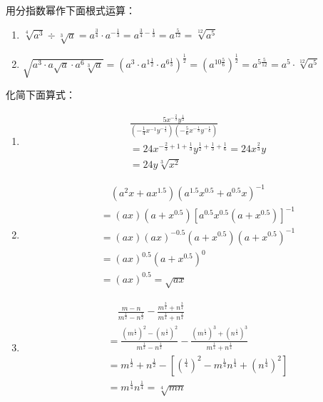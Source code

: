 \begin{example}
    用分指数幂作下面根式运算：
\begin{enumerate}
    \item $\sqrt[4]{a^3}\div \sqrt[3]{a}=a^{\tfrac{3}{4}}\cdot a^{-\tfrac{1}{3}}=a^{\tfrac{3}{4}-\tfrac{1}{3}}=a^{\tfrac{5}{12}}=\sqrt[12]{a^5}$
    \item $\sqrt{a^3\cdot a\sqrt{a}\cdot a^6 \sqrt[3]{a}}=\left(a^3\cdot a^{1\tfrac{1}{2}}\cdot a^{6\tfrac{1}{3}}\right)^{\tfrac{1}{2}}=\left(a^{10\tfrac{5}{6}}\right)^{\tfrac{1}{2}}=a^{5\tfrac{5}{12}}=a^{5}\cdot \sqrt[12]{a^5}$
\end{enumerate}
    
\end{example}

\begin{example}
    化简下面算式：
\begin{enumerate}
    \item \[\begin{split}
&\frac{5 x^{-\tfrac{2}{3}} y^{\tfrac{1}{2}}}{\left(-\frac{1}{4}x^{-1} y^{-\tfrac{1}{3}}\right)\left(-\frac{5}{6} x^{-\tfrac{1}{3}} y^{-\tfrac{1}{6}}\right)} \\
&=24 x^{-\tfrac{2}{3}+1+\tfrac{1}{3}} y^{\tfrac{1}{2}+\tfrac{1}{3}+\tfrac{1}{6}}=24 x^{\tfrac{2}{3}} y \\
&=24 y \sqrt[3]{x^{2}}
\end{split}\]
\item \[\begin{split}
& \quad   \left(a^{2} x+a x^{1.5} \right)\left(a^{1.5} x^{0.5}+a^{0.5} x\right)^{-1}\\
&=(a x)\left(a+x^{0.5}\right)\left[a^{0.5} x^{0.5} \left(a+x^{0.5}\right)\right]^{-1}\\
&=(a x)(a x)^{-0.5}\left(a+x^{0.5}\right)\left(a+x^{0.5}\right)^{-1}\\
&=(a x)^{0.5}\left(a+x^{0.5}\right)^{0}\\
&=(a x)^{0.5}=\sqrt{a x}
\end{split}\]
\item \[\begin{split}
 &\quad   \frac{m-n}{m^{\tfrac{1}{2}}-n^{\tfrac{1}{2}}}-\frac{m^{\tfrac{3}{4}}+n^{\tfrac{3}{4}}}{m^{\tfrac{1}{4}}+n^{\tfrac{1}{4}}} \\
&=\frac{\left(m^{\tfrac{1}{2}}\right)^2-\left(n^{\tfrac{1}{2}}\right)^2}{m^{\tfrac{1}{2}}-n^{\tfrac{1}{2}}}-\frac{\left(m^{\tfrac{1}{4}}\right)^3+\left(n^{\tfrac{1}{4}}\right)^3}{m^{\tfrac{1}{4}}+n^{\tfrac{1}{4}}} \\
&=m^{\tfrac{1}{2}}+n^{\tfrac{1}{2}}-\left[\left(^{\tfrac{1}{4}}\right)^2- m^{\tfrac{1}{4}}n^{\tfrac{1}{4}}+\left(n^{\tfrac{1}{4}}\right)^2\right]\\
&=m^{\tfrac{1}{4}}n^{\tfrac{1}{4}}=\sqrt[4]{mn}
\end{split}\]
\end{enumerate}
\end{example}

